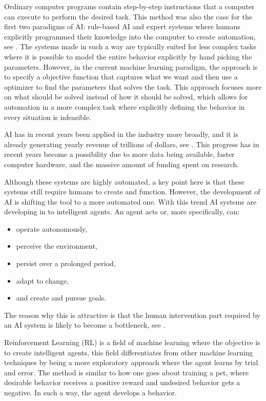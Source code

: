\documentclass[12pt,A4]{report}
\theoremstyle{definition}
\begin{document}
Ordinary computer programs contain step-by-step instructions that a computer can execute to perform the desired task. This method was also the case for the first two paradigms of AI: rule-based AI and expert systems where humans explicitly programmed their knowledge into the computer to create automation, see \citet[\textbf{CHAP}]{Superintelligence}. The systems made in such a way are typically suited for less complex tasks where it is possible to model the entire behavior explicitly by hand picking the parameters. However, in the current machine learning paradigm, the approach is to specify a objective function that captures what we want and then use a optimizer to find the parameters that solves the task. This approach focuses more on what should be solved instead of how it should be solved, which allows for automation in a more complex task where explicitly defining the behavior in every situation is infeasible. 

AI has in recent years been applied in the industry more broadly, and it is already generating yearly revenue of trillions of dollars, see \citet[\textbf{PAGE}]{RusselNorvig}. This progress has in recent years become a possibility due to more data being available, faster computer hardware, and the massive amount of funding spent on research. 

Although these systems are highly automated, a key point here is that these systems still require humans to create and function. However, the development of AI is shifting the tool to a more automated one. With this trend AI systems are developing in to intelligent agents. An agent acts or, more specifically, can:
\begin{itemize}
  \item operate autonomously,
  \item perceive the environment,
  \item persist over a prolonged period,
  \item adapt to change,
  \item and create and pursue goals.
\end{itemize}
The reason why this is attractive is that the human intervention part required by an AI system is likely to become a bottleneck, see \citet[\textbf{PAGE}]{TankandeMaskiner}.

Reinforcement Learning (RL) is a field of machine learning where the objective is to create intelligent agents, this field differentiates from other machine learning techniques by being a more exploratory approach where the agent learns by trial and error. The method is similar to how one goes about training a pet, where desirable behavior receives a positive reward and undesired behavior gets a negative. In such a way, the agent develops a behavior. %
\end{document}
